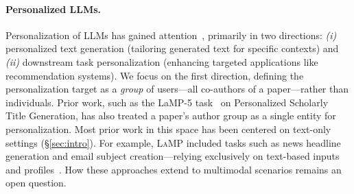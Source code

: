 \paragraph{Personalized LLMs.}
Personalization of LLMs has gained attention~\cite{zhang2024personalization}, primarily in two directions: 
{\em (i)} personalized text generation (tailoring generated text for specific contexts) and 
{\em (ii)} downstream task personalization (enhancing targeted applications like recommendation systems).
We focus on the first direction, defining the personalization target as a \textit{group} of users---all co-authors of a paper---rather than individuals. 
Prior work, such as the LaMP-5 task~\cite{salemi-etal-2024-lamp} on Personalized Scholarly Title Generation, has also treated a paper's author group as a single entity for personalization.
Most prior work in this space has been centered on text-only settings (\S\ref{sec:intro}).
For example, \textsc{LaMP} included tasks such as news headline generation and email subject creation---relying exclusively on text-based inputs and profiles~\cite{salemi-etal-2024-lamp}.
How these approaches extend to multimodal scenarios remains an open question. 









